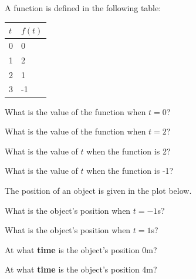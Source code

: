 \begin{problem}
\item A function is defined in the following table:

  \begin{tabular}{l|l}
    $t$ & $f(t)$ \\ \hline 
    0 & 0 \\
    1 & 2 \\
    2 & 1 \\
    3 & -1 
  \end{tabular}

  \begin{subproblem}
  \item What is the value of the function when $t=0$?
    \vfill
  \item What is the value of the function when $t=2$?
    \vfill
  \item What is the value of $t$ when the function is 2?
    \vfill
  \item What is the value of $t$ when the function is -1?
    \vfill
  \end{subproblem}

\clearpage

\item The position of an object is given in the plot below.

  \scalebox{0.55}{}

  \begin{subproblem}
    \item What is the object's position when $t=-1$s?
      \vfill

    \item What is the object's position when $t=1$s?
      \vfill

    \item At what \textbf{time} is the object's position 0m?
      \vfill

    \item At what \textbf{time} is the object's position 4m?
      \vfill

  \end{subproblem}



\end{problem}


